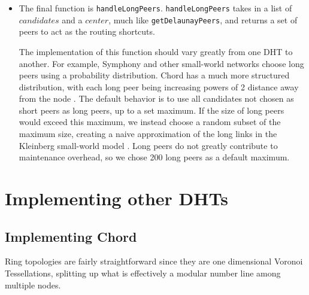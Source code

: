 \documentclass[11pt,conference]{IEEEtran}
\begin{document}
\begin{itemize}



\item The final function is \texttt{handleLongPeers}.
\texttt{handleLongPeers} takes in a list of $ candidates $ and a $ center$, much like \texttt{getDelaunayPeers}, and returns a set of peers to act as the routing shortcuts.

The implementation of this function should vary greatly from one DHT to another.
For example, Symphony \cite{symphony} and other small-world networks \cite{kleinberg2000navigation} choose long peers using a probability distribution.
Chord has a much more structured distribution, with each long peer being increasing powers of 2 distance away from the node \cite{chord}.
The default behavior is to use all candidates not chosen as short peers as long peers, up to a set maximum.
If the size of long peers would exceed this maximum, we instead choose a random subset of the maximum size, creating a naive approximation of the long links in the Kleinberg small-world model \cite{kleinberg2000navigation}.
Long peers do not greatly contribute to maintenance overhead, so we chose 200 long peers as a default maximum.


\end{itemize}






\section{Implementing other DHTs}
\label{sec:implement}
\subsection{Implementing Chord}

Ring topologies are fairly straightforward since they are one dimensional Voronoi Tessellations, splitting up what is effectively a modular number line among multiple nodes.
\end{document}
